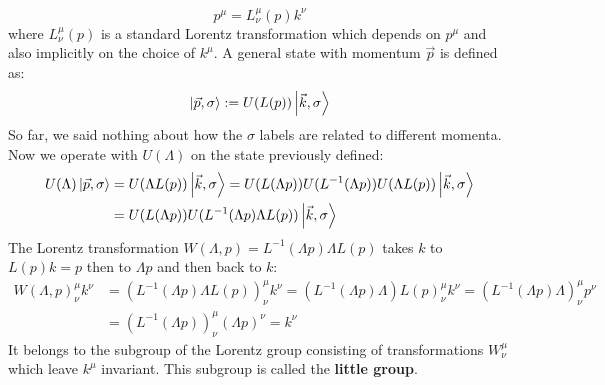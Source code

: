 \documentclass[../main.tex]{subfiles}
\begin{document}
\[
p^\mu=L^\mu_\nu(p) k^\nu
\]
where $L^\mu_\nu(p)$ is a standard Lorentz transformation which depends on $p^\mu$ and also implicitly on the choice of $k^\mu$. A general state with momentum $\Vec{p}$ is defined as:
\[
\ket{\Vec{p},\sigma}:=U(L(p))\ket{\Vec{k},\sigma}
\]
So far, we said nothing about how the $\sigma$ labels are related to different momenta. Now we operate with $U(\Lambda)$ on the state previously defined:
\begin{align*}
U(\Lambda)\ket{\Vec{p},\sigma}&=U(\Lambda L(p))\ket{\Vec{k},\sigma}=U(L(\Lambda p))U(L^{-1}(\Lambda p))U(\Lambda L(p))\ket{\Vec{k},\sigma}\\
&=U(L(\Lambda p))U(L^{-1}(\Lambda p)\Lambda L(p))\ket{\Vec{k},\sigma}
\end{align*}
The Lorentz transformation $W(\Lambda,p)=L^{-1}(\Lambda p)\Lambda L(p)$ takes $k$ to\\
$L(p)k=p$ then to $\Lambda p$ and then back to $k$:
\begin{align*}
W(\Lambda,p)^\mu_\nu k^\nu&=(L^{-1}(\Lambda p)\Lambda L(p))^\mu_\nu k^\nu=(L^{-1}(\Lambda p)\Lambda)L(p)^\mu_\nu k^\nu=(L^{-1}(\Lambda p)\Lambda)^\mu_\nu p^\nu\\
&=(L^{-1}(\Lambda p))^\mu_\nu(\Lambda p)^\nu=k^\nu
\end{align*}
It belongs to the subgroup of the Lorentz group consisting of transformations $W^\mu_\nu$ which leave $k^\mu$ invariant. This subgroup is called the \textbf{little group}.
\end{document}

